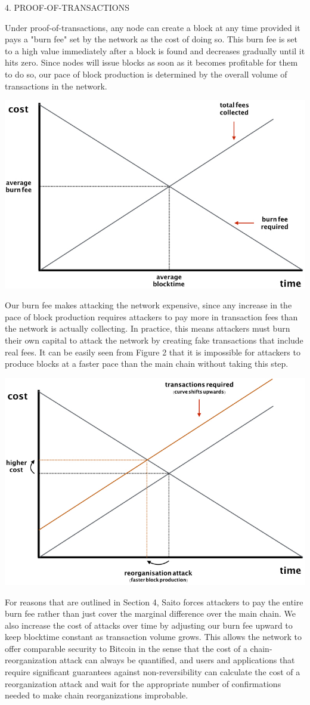 \documentclass[11.5pt, oneside]{article}   	%
\begin{document}
\begin{multicols}{2}
4. PROOF-OF-TRANSACTIONS

Under proof-of-transactions, any node can create a block at any time provided it pays a "burn fee" set by the network as the cost of doing so. This burn fee is set to a high value immediately after a block is found and decreases gradually until it hits zero. Since nodes will issue blocks as soon as it becomes profitable for them to do so, our pace of block production is determined by the overall volume of transactions in the network.

\includegraphics[width=.45\textwidth]{saito2.jpeg}

Our burn fee makes attacking the network expensive, since any increase in the pace of block production requires attackers to pay more in transaction fees than the network is actually collecting. In practice, this means attackers must burn their own capital to attack the network by creating fake transactions that include real fees. It can be easily seen from Figure 2 that it is impossible for attackers to produce blocks at a faster pace than the main chain without taking this step.

\includegraphics[width=.45\textwidth]{saito3.jpeg}

For reasons that are outlined in Section 4, Saito forces attackers to pay the entire burn fee rather than just cover the marginal difference over the main chain. We also increase the cost of attacks over time by adjusting our burn fee upward to keep blocktime constant as transaction volume grows. This allows the network to offer comparable security to Bitcoin in the sense that the cost of a chain-reorganization attack can always be quantified, and users and applications that require significant guarantees against non-reversibility can calculate the cost of a reorganization attack and wait for the appropriate number of confirmations needed to make chain reorganizations improbable.


\end{multicols}
\end{document}
